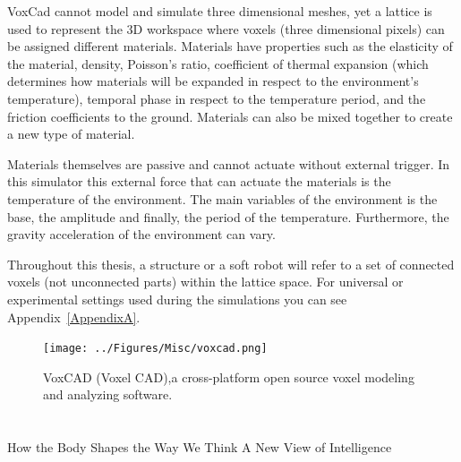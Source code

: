 VoxCad cannot model and simulate three dimensional meshes, yet a lattice is used to represent the 3D workspace where voxels (three dimensional pixels) can be assigned different materials. Materials have properties such as the elasticity of the material, density, Poisson's ratio, coefficient of thermal expansion (which determines how materials will be expanded in respect to the environment's temperature), temporal phase in respect to the temperature period, and the friction coefficients to the ground. Materials can also be mixed together to create a new type of material.

Materials themselves are passive and cannot actuate without external trigger. In this simulator this external force that can actuate the materials is the temperature of the environment. The main variables of the environment is the base, the amplitude and finally, the period of the temperature. Furthermore, the gravity acceleration of the environment can vary.

Throughout this thesis, a structure or a soft robot will refer to a set of connected voxels (not unconnected parts) within the lattice space. For universal or experimental settings used during the simulations you can see Appendix~\ref{AppendixA}.



\begin{figure}
\centering
\texttt{[image: ../Figures/Misc/voxcad.png]}
\caption{VoxCAD (Voxel CAD),a cross-platform open source voxel modeling and analyzing software.}
\label{fig:VoxCAD}
\end{figure}

\section*{}

\cite{stanley2003taxonomy}
\cite{nelson2009fitness}
\cite{meyer1998evolutionary}
How the Body Shapes the Way We Think A New View of Intelligence~\cite{pfeifer2007body}
\cite{albu2008soft}
\cite{woolley2011deleterious}
\cite{lewis1992genetic}
\cite{lapeyre2011maturational}
\cite{oudeyer2013intrinsically}
\cite{gauci:gecco07}
